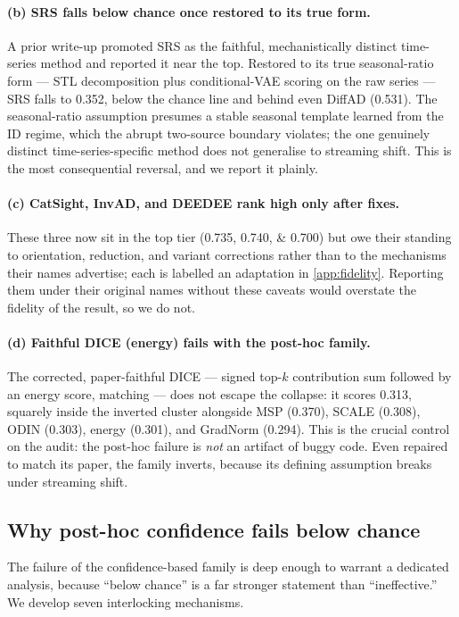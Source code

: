 \paragraph{(b) SRS falls below chance once restored to its true form.}
A prior write-up promoted SRS as the faithful, mechanistically distinct
time-series method and reported it near the top. Restored to its true
seasonal-ratio form --- STL decomposition plus conditional-VAE scoring on the raw
series --- SRS falls to \num{0.352}, below the chance line and behind even DiffAD
(\num{0.531}). The seasonal-ratio assumption presumes a stable seasonal template
learned from the ID regime, which the abrupt two-source boundary violates; the one
genuinely distinct time-series-specific method does not generalise to streaming
shift. This is the most consequential reversal, and we report it plainly.
\paragraph{(c) CatSight, InvAD, and DEEDEE rank high only after fixes.}
These three now sit in the top tier (\numlist{0.735;0.740;0.700}) but owe their
standing to orientation, reduction, and variant corrections rather than to the
mechanisms their names advertise; each is labelled an adaptation in
\cref{app:fidelity}. Reporting them under their original names without these caveats
would overstate the fidelity of the result, so we do not.
\paragraph{(d) Faithful DICE (energy) fails with the post-hoc family.}
The corrected, paper-faithful DICE --- signed top-$k$ contribution sum followed by
an energy score, matching \citet{Sun2022} --- does not escape the collapse: it
scores \num{0.313}, squarely inside the inverted cluster alongside MSP
(\num{0.370}), SCALE (\num{0.308}), ODIN (\num{0.303}), energy (\num{0.301}), and
GradNorm (\num{0.294}). This is the crucial control on the audit: the post-hoc
failure is \emph{not} an artifact of buggy code. Even repaired to match its paper,
the family inverts, because its defining assumption breaks under streaming shift.

\subsection{Why post-hoc confidence fails below chance}\label{sec:disc-fail}
The failure of the confidence-based family is deep enough to warrant a dedicated
analysis, because ``below chance'' is a far stronger statement than ``ineffective.''
We develop seven interlocking mechanisms.

